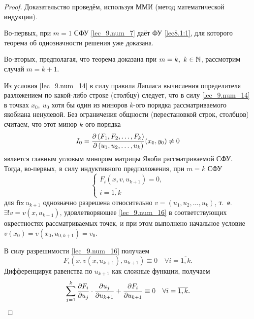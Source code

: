 \documentclass[../../main.tex]{subfiles}
\begin{document}
\begin{proof}
    Доказательство проведём, используя ММИ
    (метод математической индукции).
    
    Во-первых, при $m = 1$ СФУ \eqref{lec_9.num_7} 
    даёт ФУ \eqref{lec8.1:1}, для которого теорема об
    однозначности решения уже доказана.
    
    Во-вторых, предполагая, что теорема доказана
    при $m = k,\ k \in \mathbb{N}$, рассмотрим случай
    $m = k + 1$.
    
    Из условия \eqref{lec_9.num_14} в силу правила Лапласа
    вычисления определителя разложением по какой-либо
    строке (столбцу) следует, что в силу \eqref{lec_9.num_14} 
    в точках $x_0,\ u_0$ хотя бы один из миноров 
    $k$-ого порядка рассматриваемого якобиана ненулевой.
    Без ограничения общности (перестановкой строк, столбцов)
    считаем, что этот минор $k$-ого порядка
    \begin{equation}
        \label{lec_9.num_15}
        I_0 = \frac{\partial \left(F_1, F_2, \dots, F_k\right)}{\partial \left(u_1, u_2, \dots, u_k\right)}(x_0, y_0) \neq 0
    \end{equation}
    является главным угловым минором матрицы Якоби рассматриваемой
    СФУ. Тогда, во-первых, в силу индуктивного
    предположения, при $m = k$ СФУ
    \begin{equation}
        \label{lec_9.num_16}
        \begin{cases}
            F_i\left(x, v, u_{k+1}\right) = 0, \\
            i = \overline{1, k}
        \end{cases}
    \end{equation}
    для $\text{fix}\ u_{k+1}$ однозначно разрешена относительно 
    $v = \left(u_1, u_2, \dots, u_k\right)$, т.~е. 
    $\exists!v = v\left(x, u_{k+1}\right)$, удовлетворяющее
    \eqref{lec_9.num_16} в соответствующих окрестностях
    рассматриваемых точек, и при этом выполнено начальное 
    условие
    $v(x_0) = v(x_0, u_{0,k+1}) = v_0$.
    
    В силу разрешимости \eqref{lec_9.num_16} получаем
    \begin{equation}
	\label{lec9,a}
    F_i(x, v(x, u_{k+1}), u_{k+1}) \equiv 0\quad\forall i = \overline{1,k}.
    \end{equation}
    Дифференцируя равенства по $u_{k+1}$ как сложные функции, получаем
    \begin{equation}
	\label{lec9,b}
    \sum_{j=1}^k \frac{\partial F_i}{\partial u_j}\cdot\frac{\partial u_j}{\partial u_{k+1}} +
    \frac{\partial F_i}{\partial u_{k+1}} \equiv 0\quad\forall i = \overline{1,k}.
    \end{equation}
    

\end{proof}
\end{document}
